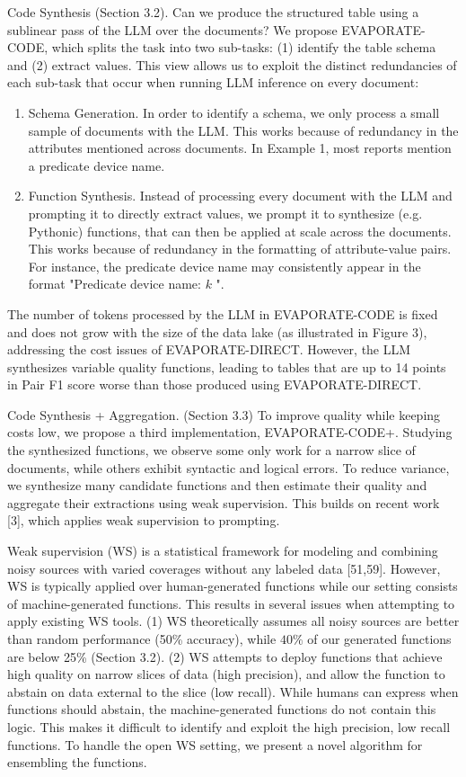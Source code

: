 \documentclass[10pt]{article}
\begin{document}
Code Synthesis (Section 3.2). Can we produce the structured table using a sublinear pass of the LLM over the documents? We propose EVAPORATE-CODE, which splits the task into two sub-tasks: (1) identify the table schema and (2) extract values. This view allows us to exploit the distinct redundancies of each sub-task that occur when running LLM inference on every document:

\begin{enumerate}
  \item Schema Generation. In order to identify a schema, we only process a small sample of documents with the LLM. This works because of redundancy in the attributes mentioned across documents. In Example 1, most reports mention a predicate device name.

  \item Function Synthesis. Instead of processing every document with the LLM and prompting it to directly extract values, we prompt it to synthesize (e.g. Pythonic) functions, that can then be applied at scale across the documents. This works because of redundancy in the formatting of attribute-value pairs. For instance, the predicate device name may consistently appear in the format "Predicate device name: $k$ ".

\end{enumerate}

The number of tokens processed by the LLM in EVAPORATE-CODE is fixed and does not grow with the size of the data lake (as illustrated in Figure 3), addressing the cost issues of EVAPORATE-DIRECT. However, the LLM synthesizes variable quality functions, leading to tables that are up to 14 points in Pair F1 score worse than those produced using EVAPORATE-DIRECT.

Code Synthesis + Aggregation. (Section 3.3) To improve quality while keeping costs low, we propose a third implementation, EVAPORATE-CODE+. Studying the synthesized functions, we observe some only work for a narrow slice of documents, while others exhibit syntactic and logical errors. To reduce variance, we synthesize many candidate functions and then estimate their quality and aggregate their extractions using weak supervision. This builds on recent work [3], which applies weak supervision to prompting.

Weak supervision (WS) is a statistical framework for modeling and combining noisy sources with varied coverages without any labeled data [51,59]. However, WS is typically applied over human-generated functions while our setting consists of machine-generated functions. This results in several issues when attempting to apply existing WS tools. (1) WS theoretically assumes all noisy sources are better than random performance (50\% accuracy), while $40 \%$ of our generated functions are below 25\% (Section 3.2). (2) WS attempts to deploy functions that achieve high quality on narrow slices of data (high precision), and allow the function to abstain on data external to the slice (low recall). While humans can express when functions should abstain, the machine-generated functions do not contain this logic. This makes it difficult to identify and exploit the high precision, low recall functions. To handle the open WS setting, we present a novel algorithm for ensembling the functions.
\end{document}

